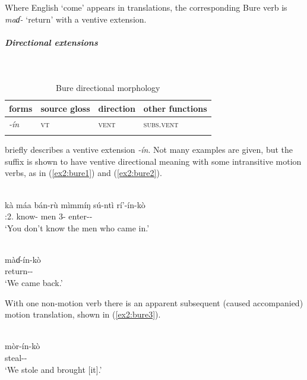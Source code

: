 Where English `come' appears in translations, the corresponding Bure verb is \textit{maɗ-} `return' with a ventive extension. 

\subparagraph{Directional extensions}~



\begin{table}[H]
	\caption{Bure directional morphology}
	\label{tab:bure}
	\begin{tabular}{llll} %
		\lsptoprule
		forms & source gloss & direction  & other functions  \\ %
		\midrule
		\textit{-ín}  &  \textsc{vt}  &  \textsc{vent} &  \textsc{subs.vent}  \\
		\lspbottomrule
	\end{tabular}
\end{table} 

\citet[70]{baticGrammaticalSketchBure2014} briefly describes a ventive extension \textit{-ín}. Not many examples are given, but the suffix is shown to have ventive directional meaning with some intransitive motion verbs, as in (\ref{ex2:bure1}) and (\ref{ex2:bure2}). 

\ea\label{ex2:bure1}
 \\
\gll kà máa bán-rù mìmmíŋ sú-ntì rí'-ín-kò	\\
:2.  know- men 3- enter--		\\
\glt `You don’t know the men who came in.'

\ex\label{ex2:bure2}
 \\
\gll màɗ-ín-kò	\\
return--		\\
\glt `We came back.'
\z 

With one non-motion verb there is an apparent subsequent (caused accompanied) motion translation, shown in (\ref{ex2:bure3}).

\ea\label{ex2:bure3}
 \\
\gll mòr-ín-kò	\\
steal--	\\
\glt `We stole and brought [it].'
\z 

